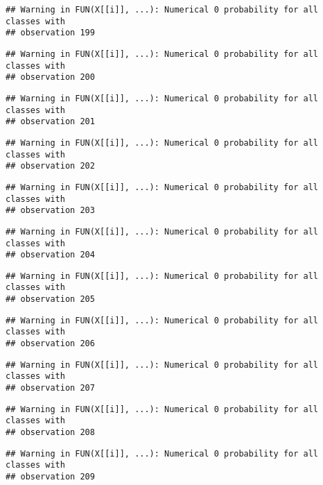 \documentclass[
]{article}
\begin{document}
\begin{verbatim}
## Warning in FUN(X[[i]], ...): Numerical 0 probability for all classes with
## observation 199
\end{verbatim}

\begin{verbatim}
## Warning in FUN(X[[i]], ...): Numerical 0 probability for all classes with
## observation 200
\end{verbatim}

\begin{verbatim}
## Warning in FUN(X[[i]], ...): Numerical 0 probability for all classes with
## observation 201
\end{verbatim}

\begin{verbatim}
## Warning in FUN(X[[i]], ...): Numerical 0 probability for all classes with
## observation 202
\end{verbatim}

\begin{verbatim}
## Warning in FUN(X[[i]], ...): Numerical 0 probability for all classes with
## observation 203
\end{verbatim}

\begin{verbatim}
## Warning in FUN(X[[i]], ...): Numerical 0 probability for all classes with
## observation 204
\end{verbatim}

\begin{verbatim}
## Warning in FUN(X[[i]], ...): Numerical 0 probability for all classes with
## observation 205
\end{verbatim}

\begin{verbatim}
## Warning in FUN(X[[i]], ...): Numerical 0 probability for all classes with
## observation 206
\end{verbatim}

\begin{verbatim}
## Warning in FUN(X[[i]], ...): Numerical 0 probability for all classes with
## observation 207
\end{verbatim}

\begin{verbatim}
## Warning in FUN(X[[i]], ...): Numerical 0 probability for all classes with
## observation 208
\end{verbatim}

\begin{verbatim}
## Warning in FUN(X[[i]], ...): Numerical 0 probability for all classes with
## observation 209
\end{verbatim}
\end{document}
